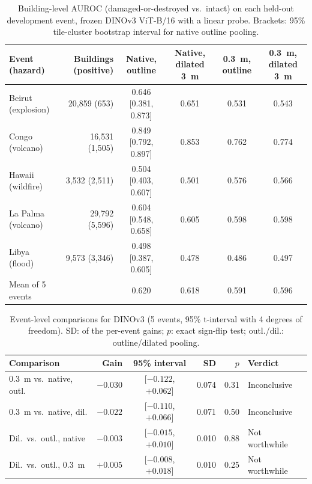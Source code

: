 \documentclass[journal]{IEEEtran}
\begin{document}
\begin{table}[t]
\centering
\caption{Building-level AUROC (damaged-or-destroyed vs.\ intact) on each held-out development event, frozen DINOv3 ViT-B/16 with a linear probe. Brackets: 95\% tile-cluster bootstrap interval for native outline pooling.}
\label{tab:auroc}
\footnotesize
\begin{tabular}{@{}lrcccc@{}}
\toprule
Event (hazard) & Buildings (positive) & Native, outline & Native, dilated 3~m & 0.3~m, outline & 0.3~m, dilated 3~m \\
\midrule
Beirut (explosion) & 20,859 (653) & 0.646 [0.381, 0.873] & 0.651 & 0.531 & 0.543 \\
Congo (volcano) & 16,531 (1,505) & 0.849 [0.792, 0.897] & 0.853 & 0.762 & 0.774 \\
Hawaii (wildfire) & 3,532 (2,511) & 0.504 [0.403, 0.607] & 0.501 & 0.576 & 0.566 \\
La Palma (volcano) & 29,792 (5,596) & 0.604 [0.548, 0.658] & 0.605 & 0.598 & 0.598 \\
Libya (flood) & 9,573 (3,346) & 0.498 [0.387, 0.605] & 0.478 & 0.486 & 0.497 \\
\midrule
Mean of 5 events & & 0.620 & 0.618 & 0.591 & 0.596 \\
\bottomrule
\end{tabular}
\end{table}

\begin{table}[t]
\centering
\caption{Event-level comparisons for DINOv3 (5 events, 95\% t-interval with 4 degrees of freedom). SD: of the per-event gains; $p$: exact sign-flip test; outl./dil.: outline/dilated pooling.}
\label{tab:cmp}
\scriptsize
\setlength{\tabcolsep}{2.5pt}
\begin{tabular}{@{}lrcrrl@{}}
\toprule
Comparison & Gain & 95\% interval & SD & $p$ & Verdict \\
\midrule
0.3~m vs.\ native, outl. & $-0.030$ & [$-0.122$, $+0.062$] & 0.074 & 0.31 & Inconclusive \\
0.3~m vs.\ native, dil. & $-0.022$ & [$-0.110$, $+0.066$] & 0.071 & 0.50 & Inconclusive \\
Dil.\ vs.\ outl., native & $-0.003$ & [$-0.015$, $+0.010$] & 0.010 & 0.88 & Not worthwhile \\
Dil.\ vs.\ outl., 0.3~m & $+0.005$ & [$-0.008$, $+0.018$] & 0.010 & 0.25 & Not worthwhile \\
\bottomrule
\end{tabular}
\end{table}
\end{document}
